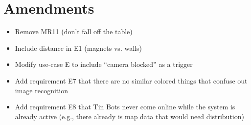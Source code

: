 \documentclass[a4paper,parskip,headheight=38pt]{scrartcl} %
\begin{document}
\section{Amendments}

\begin{itemize}
    \item Remove MR11 (don't fall off the table)
    \item Include distance in E1 (magnets vs. walls)
    \item Modify use-case E to include \enquote{camera blocked} as a trigger
    \item Add requirement E7 that there are no similar colored things that confuse out image recognition
    \item Add requirement E8 that Tin Bots never come online while the system is already active (e.g., there already is map data that would need distribution)
\end{itemize}
\end{document}
